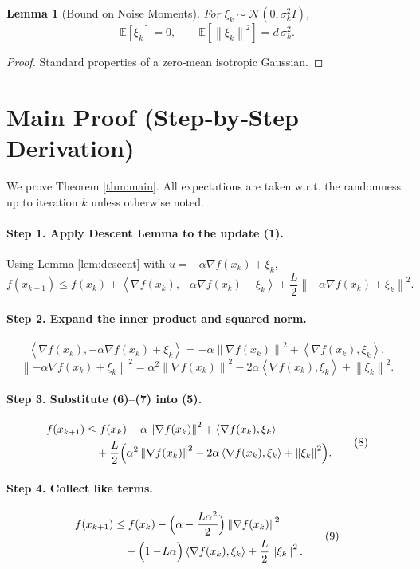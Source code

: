 \documentclass[11pt]{article}
\newtheorem{lemma}{Lemma}
\newcommand{\EE}{\mathbb{E}}
\newcommand{\norm}[1]{\left\lVert#1\right\rVert}
\newcommand{\inner}[2]{\left\langle #1,#2\right\rangle}
\begin{document}
\begin{lemma}[Bound on Noise Moments]\label{lem:noise}
For $\xi_{k}\sim\mathcal{N}(0,\sigma_{k}^{2}I)$,
\[
\EE[\xi_{k}]=0,\qquad 
\EE[\norm{\xi_{k}}^{2}]=d\,\sigma_{k}^{2}.
\tag{4}
\]
\end{lemma}
\begin{proof}
Standard properties of a zero‑mean isotropic Gaussian.
\end{proof}

\section*{Main Proof (Step‑by‑Step Derivation)}
We prove Theorem \ref{thm:main}.  
All expectations are taken w.r.t. the randomness up to iteration $k$ unless otherwise noted.

\paragraph{Step 1. Apply Descent Lemma to the update (1).}
Using Lemma \ref{lem:descent} with $u=-\alpha\nabla f(x_{k})+\xi_{k}$,
\[
f(x_{k+1})\le f(x_{k})+\inner{\nabla f(x_{k})}{-\alpha\nabla f(x_{k})+\xi_{k}}
+\frac{L}{2}\norm{-\alpha\nabla f(x_{k})+\xi_{k}}^{2}.
\tag{5}
\]

\paragraph{Step 2. Expand the inner product and squared norm.}
\[
\inner{\nabla f(x_{k})}{-\alpha\nabla f(x_{k})+\xi_{k}}
= -\alpha\norm{\nabla f(x_{k})}^{2}+\inner{\nabla f(x_{k})}{\xi_{k}},
\tag{6}
\]
\[
\norm{-\alpha\nabla f(x_{k})+\xi_{k}}^{2}
= \alpha^{2}\norm{\nabla f(x_{k})}^{2}
-2\alpha\inner{\nabla f(x_{k})}{\xi_{k}}+\norm{\xi_{k}}^{2}.
\tag{7}
\]

\paragraph{Step 3. Substitute (6)–(7) into (5).}
\[
\begin{aligned}
f(x_{k+1}) &\le f(x_{k})
-\alpha\norm{\nabla f(x_{k})}^{2}
+\inner{\nabla f(x_{k})}{\xi_{k}}\\
&\quad +\frac{L}{2}\Bigl(\alpha^{2}\norm{\nabla f(x_{k})}^{2}
-2\alpha\inner{\nabla f(x_{k})}{\xi_{k}}+\norm{\xi_{k}}^{2}\Bigr).
\end{aligned}
\tag{8}
\]

\paragraph{Step 4. Collect like terms.}
\[
\begin{aligned}
f(x_{k+1}) &\le f(x_{k})
-\Bigl(\alpha-\frac{L\alpha^{2}}{2}\Bigr)\norm{\nabla f(x_{k})}^{2}\\
&\quad +\Bigl(1-\!L\alpha\Bigr)\inner{\nabla f(x_{k})}{\xi_{k}}
+\frac{L}{2}\norm{\xi_{k}}^{2}.
\end{aligned}
\tag{9}
\]
\end{document}
